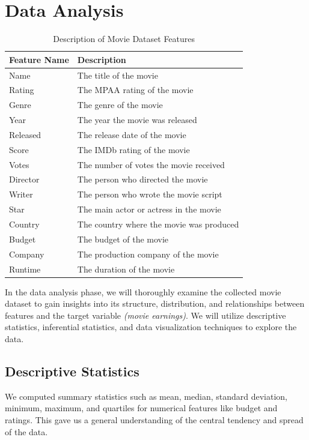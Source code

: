 \documentclass[conference]{IEEEtran}
\begin{document}
\section{Data Analysis}
   \begin{table}[h]
    \centering
    \captionsetup{justification=centering}
    \caption{Description of Movie Dataset Features}
    \label{tab:movie_dataset_features}
    \renewcommand{\arraystretch}{1.5}
    \begin{tabular}{>{\centering\arraybackslash}m{1cm} >{\centering\arraybackslash}m{6cm}}
        \toprule
        \textbf{Feature Name} & \textbf{Description} \\
        \midrule
        Name & The title of the movie \\
        Rating & The MPAA rating of the movie \\
        Genre & The genre of the movie \\
        Year & The year the movie was released \\
        Released & The release date of the movie \\
        Score & The IMDb rating of the movie \\
        Votes & The number of votes the movie received \\
        Director & The person who directed the movie \\
        Writer & The person who wrote the movie script \\
        Star & The main actor or actress in the movie \\
        Country & The country where the movie was produced \\
        Budget & The budget of the movie \\
        Company & The production company of the movie \\
        Runtime & The duration of the movie \\
        \bottomrule
    \end{tabular}
\end{table}

    In the data analysis phase, we will thoroughly examine the collected movie dataset to gain insights into its structure, distribution, and relationships between features and the target variable \textit{(movie earnings)}. We will utilize descriptive statistics, inferential statistics, and data visualization techniques to explore the data.
    
    \subsection{Descriptive Statistics}
        We computed summary statistics such as mean, median, standard deviation, minimum, maximum, and quartiles for numerical features like budget and ratings. This gave us a general understanding of the central tendency and spread of the data.
    
\end{document}
